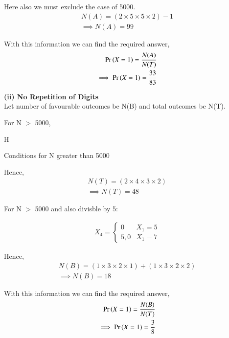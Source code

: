 \documentclass{article}
\begin{document}
Here also we must exclude the case of 5000.
\begin{align}
	N(A)=(2\times5\times5\times2)-1 \\
	\implies N(A)=99
\end{align}

With this information we can find the required answer,
\begin{align}
	\Pr\left(X=1\right)=\frac{N(A)}{N(T)}\\
	\implies \Pr\left(X=1\right)=\frac{33}{83}
\end{align}

\textbf{(ii) No Repetition of Digits}\\
Let number of favourable outcomes be N(B) and total outcomes be N(T).

For N $>$ 5000,

H\begin{table}[h]
    \centering
    
    \caption{Conditions for N greater than 5000}
    \label{table_4_anek}
    \end{table}
Hence,
\begin{align}
	N(T)=(2\times4\times3\times2) \\
	\implies N(T)=48
\end{align}

For N $>$ 5000 and also divisble by 5:

\begin{align}
	X_{4} = \begin{cases}
		0 & X_{1}=5 \\
		5,0 & X_{1}=7
	\end{cases}
\end{align}

Hence,
\begin{align}
	N(B)=(1\times3\times2\times1)+(1\times3\times2\times2) \\
	\implies N(B)=18
\end{align}

With this information we can find the required answer,
\begin{align}
	\Pr\left(X=1\right)=\frac{N(B)}{N(T)}\\
	\implies \Pr\left(X=1\right)=\frac{3}{8}
\end{align}
\end{document}
